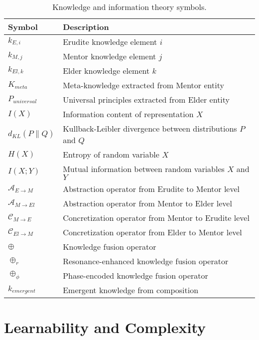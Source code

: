 \begin{table}[h]
\centering
\begin{tabular}{|l|p{10cm}|}
\hline
\textbf{Symbol} & \textbf{Description} \\
\hline
$k_{E,i}$ & Erudite knowledge element $i$ \\
\hline
$k_{M,j}$ & Mentor knowledge element $j$ \\
\hline
$k_{El,k}$ & Elder knowledge element $k$ \\
\hline
$K_{meta}$ & Meta-knowledge extracted from Mentor entity \\
\hline
$P_{universal}$ & Universal principles extracted from Elder entity \\
\hline
$I(X)$ & Information content of representation $X$ \\
\hline
$d_{KL}(P \parallel Q)$ & Kullback-Leibler divergence between distributions $P$ and $Q$ \\
\hline
$H(X)$ & Entropy of random variable $X$ \\
\hline
$I(X; Y)$ & Mutual information between random variables $X$ and $Y$ \\
\hline
$\mathcal{A}_{E \rightarrow M}$ & Abstraction operator from Erudite to Mentor level \\
\hline
$\mathcal{A}_{M \rightarrow El}$ & Abstraction operator from Mentor to Elder level \\
\hline
$\mathcal{C}_{M \rightarrow E}$ & Concretization operator from Mentor to Erudite level \\
\hline
$\mathcal{C}_{El \rightarrow M}$ & Concretization operator from Elder to Mentor level \\
\hline
$\oplus$ & Knowledge fusion operator \\
\hline
$\oplus_r$ & Resonance-enhanced knowledge fusion operator \\
\hline
$\oplus_{\phi}$ & Phase-encoded knowledge fusion operator \\
\hline
$k_{emergent}$ & Emergent knowledge from composition \\
\hline
\end{tabular}
\caption{Knowledge and information theory symbols.}
\label{tab:symbols_knowledge}
\end{table}

\section{Learnability and Complexity}

